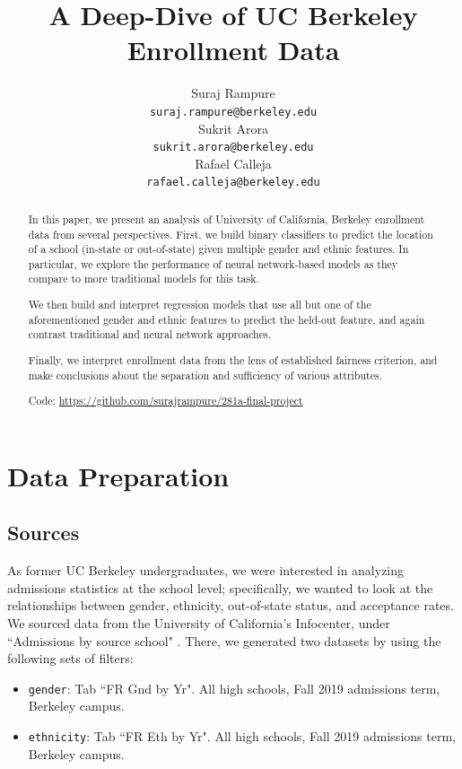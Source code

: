 \documentclass{article}
\title{A Deep-Dive of UC Berkeley Enrollment Data}
\author{%
  Suraj Rampure \\
  \texttt{suraj.rampure@berkeley.edu} \\
  \And
  Sukrit Arora \\
  \texttt{sukrit.arora@berkeley.edu} \\
  \And
  Rafael Calleja \\
  \texttt{rafael.calleja@berkeley.edu} \\
}
\begin{document}
\maketitle

\begin{abstract}
In this paper, we present an analysis of University of California, Berkeley enrollment data from several perspectives. First, we build binary classifiers to predict the location of a school (in-state or out-of-state) given multiple gender and ethnic features. In particular, we explore the performance of neural network-based models as they compare to more traditional models for this task.

We then build and interpret regression models that use all but one of the aforementioned gender and ethnic features to predict the held-out feature, and again contrast traditional and neural network approaches.

Finally, we interpret enrollment data from the lens of established fairness criterion, and make conclusions about the separation and sufficiency of various attributes.

Code: \url{https://github.com/surajrampure/281a-final-project}

\end{abstract}

\section{Data Preparation} 

\subsection{Sources}

As former UC Berkeley undergraduates, we were interested in analyzing admissions statistics at the school level; specifically, we wanted to look at the relationships between gender, ethnicity, out-of-state status, and acceptance rates. We sourced data from the University of California's Infocenter, under ``Admissions by source school" \cite{admissions-website}. There, we generated two datasets by using the following sets of filters:
\begin{itemize}
    \item \texttt{gender}: Tab ``FR Gnd by Yr". All high schools, Fall 2019 admissions term, Berkeley campus.
    \item \texttt{ethnicity}: Tab ``FR Eth by Yr". All high schools, Fall 2019 admissions term, Berkeley campus.
\end{itemize}
\end{document}
